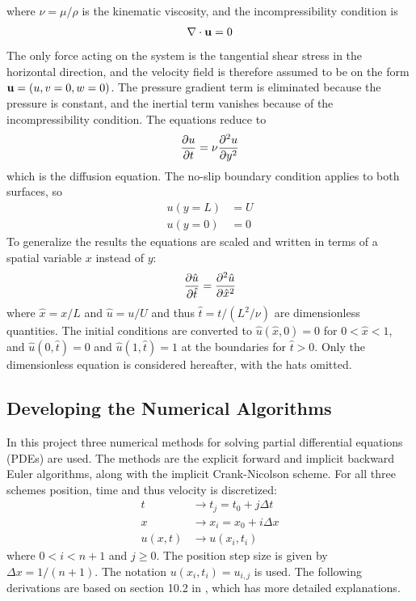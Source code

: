 \documentclass[aps,reprint]{revtex4-1}
\begin{document}
where $\nu = \mu/\rho$ is the kinematic viscosity, and the incompressibility
condition is
\begin{align*}
  \nabla \cdot \vb{u} = 0
\end{align*}
The only force acting on the system is the tangential shear stress in the
horizontal direction, and the velocity field is therefore assumed to be on the
form $\vb{u} = (u,v = 0,w = 0)$. The pressure gradient term is eliminated because the
pressure is constant, and the inertial term vanishes because of the incompressibility
condition. The equations reduce to
\begin{align}
  \pdv{u}{t} = \nu \pdv[2]{u}{y}
\end{align}
which is the diffusion equation. The no-slip boundary condition applies to both
surfaces, so
\begin{align*}
  u(y = L) &= U \\
  u(y = 0) &= 0
\end{align*}
To generalize the results the equations are scaled and written in terms of
a spatial variable $x$ instead of $y$:
\begin{align}
  \pdv{\hat{u}}{\hat{t}} = \pdv[2]{\hat{u}}{\hat{x}}
\end{align}
where $\hat{x} = x / L$ and $\hat{u} = u / U$ and thus $\hat{t} = t / (L^2 / \nu)$ are dimensionless quantities.
The initial conditions are converted to $\hat{u}(\hat{x},0) = 0$ for $0 < \hat{x} < 1$,
and $\hat{u}(0,\hat{t}) = 0$ and $\hat{u}(1,\hat{t}) = 1$ at the boundaries for $\hat{t} > 0$.
Only the dimensionless equation is considered hereafter, with the hats omitted.
\subsection{Developing the Numerical Algorithms}
In this project three numerical methods for solving partial differential equations (PDEs)
are used. The methods are the explicit forward and implicit backward Euler
algorithms, along with the implicit Crank-Nicolson scheme. For all three schemes
position, time and thus velocity is discretized:
\begin{align*}
  t &\rightarrow t_j = t_0 + j \Delta{t} \\
  x &\rightarrow x_i = x_0 + i \Delta{x} \\
  u(x,t) &\rightarrow u(x_i, t_i)
\end{align*}
where $0 < i < n + 1$ and $j \geq 0$. The position step size is given by $\Delta{x} = 1 /(n+1)$.
The notation $u(x_i,t_i) = u_{i,j}$ is used. The following derivations are based on
section 10.2 in \cite{mortenjensen}, which has more detailed explanations.
\end{document}
